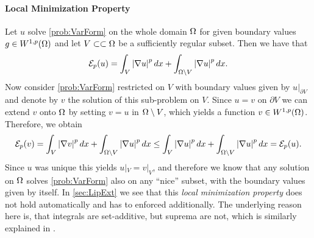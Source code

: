 \paragraph*{Local Minimization Property} Let $u$ solve \cref{prob:VarForm} on the whole domain $\Omega$ for given boundary values $g\in W^{1,p}(\Omega)$ and let $V\subset\subset\Omega$ be a sufficiently regular subset. Then we have that
%
\begin{align*}
\mathcal{E}_p(u) = \int_{V} \left|\nabla u\right|^p dx + \int_{\Omega\setminus V} \left|\nabla u\right|^p dx.
\end{align*}
%
Now consider \cref{prob:VarForm} restricted on $V$ with boundary values given by $u|_{\partial V}$ and denote by $v$ the solution of this sub-problem on $V$. Since $u=v$ on $\partial V$ we can extend $v$ onto $\Omega$ by setting $v=u$ in $\Omega\setminus V$, which yields a function $v\in W^{1,p}(\Omega)$. Therefore, we obtain
%
\begin{align*}
\mathcal{E}_p(v) = \int_{V} \left|\nabla v\right|^p dx + \int_{\Omega\setminus V} \left|\nabla u\right|^p dx \leq 
\int_{V} \left|\nabla u\right|^p dx + \int_{\Omega\setminus V} \left|\nabla u\right|^p dx = \mathcal{E}_p(u).
\end{align*}
%
Since $u$ was unique this yields $u|_V = v|_V$, and therefore we know that any solution on $\Omega$ solves \cref{prob:VarForm} also on any \enquote{nice} subset, with the boundary values given by itself. In \cref{sec:LipExt} we see that this \textit{local minimization property} does not hold automatically and has to enforced additionally. The underlying reason here is, that integrals are set-additive, but suprema are not, which is similarly explained in \cite{aronsson2004tour}.

%
%
